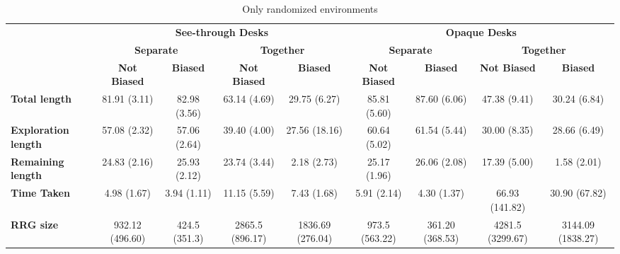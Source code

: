 \begin{table*}[]
    \centering
    \caption{Only randomized environments }
    \label{tab:my_label2}
    \setlength{\tabcolsep}{3pt}
    \scriptsize
    \begin{tabular}{l c c c c c c c c }
        \toprule
        \textbf{} & \multicolumn{4}{c}{\textbf{See-through Desks}} & \multicolumn{4}{c}{\textbf{Opaque Desks}} \\
        \cmidrule(lr{.75em}){2-5} \cmidrule(l{.75em}r){6-9}
		\textbf{} & \multicolumn{2}{c}{\textbf{Separate}} & \multicolumn{2}{c}{\textbf{Together}} &
		            \multicolumn{2}{c}{\textbf{Separate}} & \multicolumn{2}{c}{\textbf{Together}}\\
		\cmidrule(lr{.75em}){2-3} \cmidrule(l{.75em}r){4-5} \cmidrule(lr{.75em}){6-7} \cmidrule(l{.75em}r){8-9}
		\textbf{} & \textbf{Not Biased} & \textbf{Biased} & \textbf{Not Biased} & \textbf{Biased} & 
		            \textbf{Not Biased} & \textbf{Biased} & \textbf{Not Biased} & \textbf{Biased}\\
		\midrule
		\textbf{Total length}     & 81.91 (3.11) & 82.98 (3.56) & 63.14 (4.69) & 29.75 (6.27) & 
		                            85.81 (5.60) & 87.60 (6.06) & 47.38 (9.41) & 30.24 (6.84)\\
		\textbf{Exploration length}  & 57.08 (2.32) & 57.06 (2.64) & 39.40 (4.00) & 27.56 (18.16) & 
		                            60.64 (5.02) & 61.54 (5.44) & 30.00 (8.35) & 28.66 (6.49)\\
		\textbf{Remaining length} & 24.83 (2.16) & 25.93 (2.12) & 23.74 (3.44) & 2.18 (2.73) & 
		                            25.17 (1.96) & 26.06 (2.08) & 17.39 (5.00) & 1.58 (2.01)\\
		\textbf{Time Taken}       & 4.98 (1.67) & 3.94 (1.11) & 11.15 (5.59) & 7.43 (1.68) & 
		                            5.91 (2.14) & 4.30 (1.37) & 66.93 (141.82) & 30.90 (67.82)\\
		\textbf{RRG size}         &932.12 (496.60) & 424.5 (351.3) & 2865.5 (896.17) & 1836.69 (276.04)&
		                           973.5 (563.22) & 361.20 (368.53) & 4281.5 (3299.67) & 3144.09 (1838.27)\\
		\bottomrule
    \end{tabular}
\end{table*}